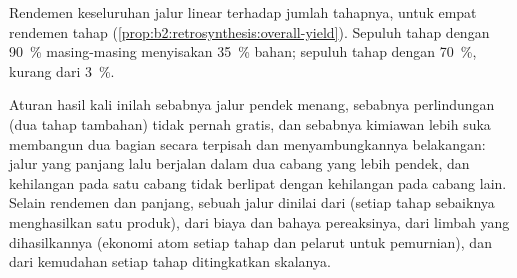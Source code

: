 \begin{omfigure}
\par\vspace{4pt}

{\small Rendemen keseluruhan jalur linear terhadap jumlah tahapnya, untuk
empat rendemen tahap (\cref{prop:b2:retrosynthesis:overall-yield}). Sepuluh
tahap dengan 90~\% masing-masing menyisakan 35~\% bahan; sepuluh
tahap dengan 70~\%, kurang dari 3~\%.}
\end{omfigure}

Aturan hasil kali inilah sebabnya jalur pendek menang, sebabnya perlindungan
(dua tahap tambahan) tidak pernah gratis, dan sebabnya kimiawan lebih suka
membangun dua bagian secara terpisah dan menyambungkannya belakangan: jalur
yang panjang lalu berjalan dalam dua cabang yang lebih pendek, dan kehilangan
pada satu cabang tidak berlipat dengan kehilangan pada cabang lain. Selain
rendemen dan panjang, sebuah jalur dinilai dari  (setiap
tahap sebaiknya menghasilkan satu produk), dari biaya dan bahaya
pereaksinya, dari limbah yang dihasilkannya (ekonomi atom setiap tahap dan
pelarut untuk pemurnian), dan dari kemudahan setiap tahap ditingkatkan
skalanya.

